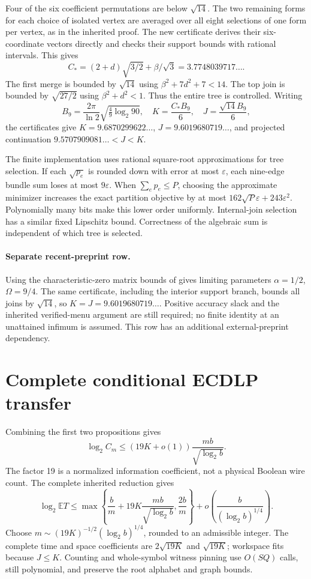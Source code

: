 \documentclass[11pt]{article}
\begin{document}
Four of the six coefficient permutations are below $\sqrt{14}$.
The two remaining forms for each choice of isolated vertex are
averaged over all eight selections of one form per vertex, as in
the inherited proof. The new certificate derives their six-coordinate
vectors directly and checks their support bounds with rational
intervals. This gives
\[
 C_*=(2+d)\sqrt{3/2}+\beta/\sqrt3
      =3.7748039717\ldots.
\]
The first merge is bounded by $\sqrt{14}$ using
$\beta^2+7d^2+7<14$. The top join is bounded by $\sqrt{27/2}$
using $\beta^2+d^2<1$. Thus the entire tree is controlled.
Writing
\[
 B_9=\frac{2\pi}{\ln2}\sqrt{\tfrac49\log_2 90},
 \quad K=\frac{C_*B_9}{6},\quad J=\frac{\sqrt{14}B_9}{6},
\]
the certificates give $K=9.6870299622\ldots$, $J=9.6019680719\ldots$,
and projected continuation $9.5707909081\ldots<J<K$.

The finite implementation uses rational square-root approximations
for tree selection. If each $\sqrt{p_e}$ is rounded down with error
at most $\varepsilon$, each nine-edge bundle sum loses at most
$9\varepsilon$. When $\sum_ep_e\le P$, choosing the approximate
minimizer increases the exact partition objective by at most
$162\sqrt P\varepsilon+243\varepsilon^2$. Polynomially many bits
make this lower order uniformly. Internal-join selection has a
similar fixed Lipschitz bound. Correctness of the algebraic sum is
independent of which tree is selected.

\paragraph{Separate recent-preprint row.}
Using the characteristic-zero matrix bounds of \cite{uznanski}
gives limiting parameters $\alpha=1/2$, $\Omega=9/4$.
The same certificate, including the interior support branch, bounds
all joins by $\sqrt{14}$, so $K=J=9.6019680719\ldots$.
Positive accuracy slack and the inherited verified-menu argument
are still required; no finite identity at an unattained infimum is
assumed. This row has an additional external-preprint dependency.

\section{Complete conditional ECDLP transfer}
Combining the first two propositions gives
\[
 \log_2 C_m\le(19K+o(1))\frac{mb}{\sqrt{\log_2b}}.
\]
The factor 19 is a normalized information coefficient, not a
physical Boolean wire count. The complete inherited reduction gives
\[
 \log_2\mathbb ET\le
 \max\left\{\frac bm+19K\frac{mb}{\sqrt{\log_2b}},\frac{2b}{m}\right\}
 +o\left(\frac b{(\log_2b)^{1/4}}\right).
\]
Choose $m\sim(19K)^{-1/2}(\log_2b)^{1/4}$, rounded to an
admissible integer. The complete time and space coefficients are
$2\sqrt{19K}$ and $\sqrt{19K}$; workspace fits because $J\le K$.
Counting and whole-symbol witness pinning use $O(SQ)$ calls, still
polynomial, and preserve the root alphabet and graph bounds.
\end{document}
